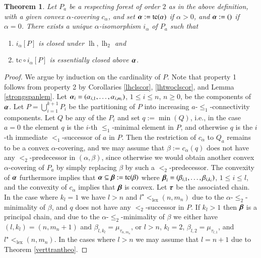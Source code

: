 \documentclass[3p,10pt,times]{elsarticle}
\newcommand{\al}{\alpha}
\newcommand{\alvec}{{\vec{\al}}}
\newcommand{\be}{\beta}
\newcommand{\bevec}{{\vec{\be}}}
\newcommand{\tauvec}{{\vec{\tau}}}
\newcommand{\leo}{\le_1}
\newcommand{\lo}{<_1}
\newcommand{\klex}{<_\mathrm{\scriptscriptstyle{lex}}}
\newcommand{\lh}{{\operatorname{lh}}}
\newtheorem{theo}{Theorem}[section]
\newcommand{\tc}{{\mathrm{tc}}}
\newcommand{\letwo}{\le_2}
\newcommand{\ktwo}{<_2}
\newcommand{\alcp}[1]{{\al_{#1}}}
\newcommand{\becp}[1]{{\be_{#1}}}
\newcommand{\taucp}[1]{{\tau_{#1}}}
\def\vec#1{\mathchoice{\mbox{\boldmath$\displaystyle#1$}}
{\mbox{\boldmath$\textstyle#1$}}
{\mbox{\boldmath$\scriptstyle#1$}}
{\mbox{\boldmath$\scriptscriptstyle#1$}}}
\begin{document}
\begin{theo}\label{isomtheo}
Let $P_a$ be a respecting forest of order $2$ as in the above definition, with a given convex $\al$-covering $c_\al$, and set
$\alvec:=\tc(\al)$ if $\al>0$, and $\alvec:=()$ if $\al=0$. 
There exists 
a unique $\al$-isomorphism $i_\al$ of $P_a$ such that 
\begin{enumerate}
\item $i_\al[P]$ is closed under $\lh,\lh_2$ and 
\item $\tc\circ i_\al[P]$ is essentially closed above $\alvec$.
\end{enumerate}
\end{theo}
\begin{proof} We argue by induction on the cardinality of $P$. 
Note that property 1 follows from property 2 by Corollaries \ref{lhclscor}, \ref{lhtwoclscor}, and Lemma \ref{strongspanlem}.
Let $\alvec_i=(\alcp{i,1},\ldots,\alcp{i,m_i})$, $1\le i\le n$, $n\ge0$, be the components of $\alvec$. 
Let $P=\bigcup_{i=1}^{k+1} P_i$ be the partitioning of $P$ into increasing $a$-$\leo$-connectivity components.
Let $Q$ be any of the $P_i$ and set $q:=\min(Q)$, i.e., in the case $a=0$ the element $q$ is the $i$-th $\leo$-minimal element in $P$,
and otherwise $q$ is the $i$-th immediate $\lo$-successor of $a$ in $P$. 
Then the restriction of $c_\al$ to $Q_a$ remains to be a convex $\al$-covering, 
and we may assume that $\be:=c_\al(q)$ does not have any $\ktwo$-predecessor in 
$(\al,\be)$, since otherwise we would obtain another convex $\al$-covering of $P_a$ by simply replacing $\be$ by such a $\ktwo$-predecessor.
The convexity of $\alvec$ furthermore implies that $\alvec\subseteq\bevec:=\tc(\be)$ where $\bevec_i=(\becp{i,1},\ldots,\becp{i,k_i})$,
$1\le i\le l$, and the convexity of $c_\al$ implies that $\bevec$ is convex. 
Let $\tauvec$ be the associated chain. In the case where $k_l=1$ we have $l>n$ and $l^\star\klex(n,m_n)$ due to the 
$\al$-$\letwo$-minimality of $\be$, and $q$ does not have any $\ktwo$-successor in $P$. If $k_l>1$ then $\bevec$ is a principal chain, 
and due to the $\al$-$\letwo$-minimality of $\be$ we either have $(l,k_l)=(n,m_n+1)$ and $\becp{l,k_l}=\mu_\taucp{n,m_n}$, or $l>n$, 
$k_l=2$, $\becp{l,2}=\mu_\taucp{l,1}$, and $l^\star\klex(n,m_n)$. 
In the cases where $l>n$ we may assume that $l=n+1$ due to Theorem \ref{verttrantheo}.  


\end{proof}
\end{document}
